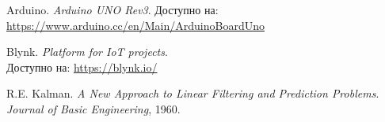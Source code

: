 \documentclass[a4paper,12pt]{article}
\begin{document}
\begin{thebibliography}{9}
Arduino. \textit{Arduino UNO Rev3}. Доступно на: \url{https://www.arduino.cc/en/Main/ArduinoBoardUno}

Blynk. \textit{Platform for IoT projects}. \\ 
Доступно на: \url{https://blynk.io/}

R.E. Kalman. \textit{A New Approach to Linear Filtering and Prediction Problems}. \\ 
\textit{Journal of Basic Engineering}, 1960.
\end{thebibliography}
\end{document}
